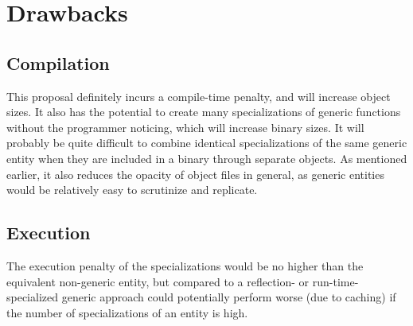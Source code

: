 \documentclass[10pt,a4paper]{article}
\begin{document}
\section{Drawbacks}
\subsection{Compilation}
This proposal definitely incurs a compile-time penalty, and will increase object sizes.  It also has the potential to create many specializations of generic functions without the programmer noticing, which will increase binary sizes.  It will probably be quite difficult to combine identical specializations of the same generic entity when they are included in a binary through separate objects.  As mentioned earlier, it also reduces the opacity of object files in general, as generic entities would be relatively easy to scrutinize and replicate.

\subsection{Execution}
The execution penalty of the specializations would be no higher than the equivalent non-generic entity, but compared to a reflection- or run-time-specialized generic approach could potentially perform worse (due to caching) if the number of specializations of an entity is high.
\end{document}
